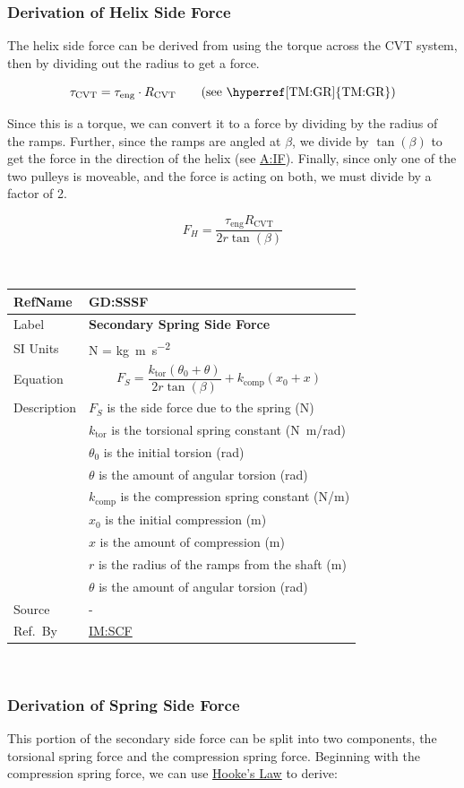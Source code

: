 \documentclass[12pt]{article}
\newcommand{\colAwidth}{0.13\textwidth}
\newcommand{\colBwidth}{0.82\textwidth}
\newcommand{\hpref}[1]{\hyperref[#1]{#1}}
\newcommand{\defgeneral}[7] {
~\newline
\noindent
\begin{minipage}{\textwidth}
\renewcommand*{\arraystretch}{1.5}
\begin{tabular}{| p{\colAwidth} | p{\colBwidth}|}
  \hline
  \rowcolor[gray]{0.9}
  RefName& \textbf{#1} \label{#1}\\
  \hline
  Label& \bf #2 \\
  \hline
  SI Units& #3\\
  \hline
  Equation& #4\\
  \hline
  Description& #5 \\
  \hline
  Source& #6 \\
  \hline
  Ref.\ By & #7\\
  \hline
\end{tabular}
\end{minipage}\\
}
\begin{document}
\subsubsection*{Derivation of Helix Side Force}
The helix side force can be derived from using the torque across the CVT system, then by dividing out the radius to get a force.

\[ \tau_\text{CVT} = \tau_\text{eng} \cdot R_{\text{CVT}} \tag*{\text{(see \hyperref[TM:GR]{TM:GR})}}\]

Since this is a torque, we can convert it to a force by dividing by the radius of the ramps. Further, since the ramps are angled at $\beta$, we divide by $\tan(\beta)$ to get the force in the direction of the helix (see \hpref{A:IF}). Finally, since only one of the two pulleys is moveable, and the force is acting on both, we must divide by a factor of 2.

\[ F_H = \frac{\tau_\text{eng} R_{\text{CVT}}}{2r\tan(\beta)} \]


\defgeneral
{GD:SSSF}
{Secondary Spring Side Force} %
{N = \si{\kilogram \metre\per\square\second}} %
{\[F_S = \frac{k_{\text{tor}}(\theta_0 + \theta)}{2r\tan(\beta)} + k_\text{comp}(x_0 + x)\]} %
{$F_S$ is the side force due to the spring (N) \\
& $k_{\text{tor}}$ is the torsional spring constant (\si[per-mode=symbol] {\newton\metre\per\radian}) \\
& $\theta_0$ is the initial torsion (rad) \\
& $\theta$ is the amount of angular torsion (rad) \\
& $k_{\text{comp}}$ is the compression spring constant (\si[per-mode=symbol] {\newton\per\metre}) \\
& $x_0$ is the initial compression (m) \\
& $x$ is the amount of compression (m) \\
& $r$ is the radius of the ramps from the shaft (m) \\
& $\theta$ is the amount of angular torsion (rad)} %
{-} %
{\hpref{IM:SCF}} %

\subsubsection*{Derivation of Spring Side Force}

This portion of the secondary side force can be split into two components, the torsional spring force and the compression spring force. 
Beginning with the compression spring force, we can use \hyperref[TM:HL]{Hooke's Law} to derive:
\end{document}
